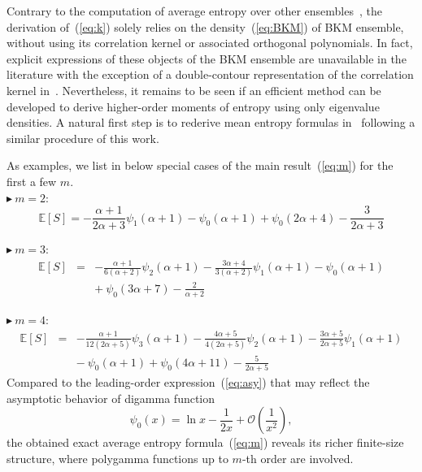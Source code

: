 \documentclass[pdflatex,sn-mathphys-num]{sn-jnl}%
\theoremstyle{thmstyleone}
\begin{document}
Contrary to the computation of average entropy over other ensembles~\cite{Page93,Foong94,Ruiz95,Kumar19,Wei20BHA,Bianchi21}, the derivation of~(\ref{eq:k}) solely relies on the density~(\ref{eq:BKM}) of BKM ensemble, without using its correlation kernel or associated orthogonal polynomials. In fact, explicit expressions of these objects of the BKM ensemble are unavailable in the literature with the exception of a double-contour representation of the correlation kernel in~\cite{Forrester17}. Nevertheless, it remains to be seen if an efficient method can be developed to derive higher-order moments of entropy using only eigenvalue densities. A natural first step is to rederive mean entropy formulas in~\cite{Page93,Foong94,Ruiz95,Kumar19,Wei20BHA,Bianchi21} following a similar procedure of this work.

As examples, we list in below special cases of the main result~(\ref{eq:m}) for the first a few $m$. \\

$\blacktriangleright~m=2$:
\begin{equation}
\mathbb{E}\left[S\right]=-\frac{\alpha+1}{2\alpha+3}\psi_{1}(\alpha+1)-\psi_{0}(\alpha+1)+\psi_{0}(2\alpha+4)-\frac{3}{2\alpha+3}
\end{equation}

$\blacktriangleright~m=3$:
\begin{eqnarray}
\mathbb{E}\left[S\right]&=&-\frac{\alpha+1}{6(\alpha+2)}\psi_{2}(\alpha+1)-\frac{3\alpha+4}{3(\alpha+2)}\psi_{1}(\alpha+1)-\psi_{0}(\alpha+1)\nonumber\\
&&+~\!\psi_{0}(3\alpha+7)-\frac{2}{\alpha+2}
\end{eqnarray}

$\blacktriangleright~m=4$:
\begin{eqnarray}
\mathbb{E}\left[S\right]&=&-\frac{\alpha+1}{12(2\alpha+5)}\psi_{3}(\alpha+1)-\frac{4\alpha+5}{4(2\alpha+5)}\psi_{2}(\alpha+1)-\frac{3\alpha+5}{2\alpha+5}\psi_{1}(\alpha+1)\nonumber\\
&&-~\!\psi_{0}(\alpha+1)+\psi_{0}(4\alpha+11)-\frac{5}{2\alpha+5}
\end{eqnarray}
Compared to the leading-order expression~(\ref{eq:asy}) that may reflect the asymptotic behavior of digamma function~\cite{Brychkov}
\begin{equation}
\psi_{0}(x)=\ln x-\frac{1}{2x}+\mathcal{O}\left(\frac{1}{x^2}\right),
\end{equation}
the obtained exact average entropy formula~(\ref{eq:m}) reveals its richer finite-size structure, where polygamma functions up to $m$-th order are involved. 
\end{document}
